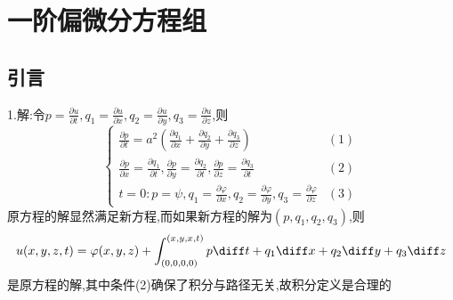 \chapter{一阶偏微分方程组}
\section{引言}
1.解:令$p=\frac{\partial u}{\partial t},q_1=\frac{\partial u}{\partial x},q_2=\frac{\partial u}{\partial y},q_3=\frac{\partial u}{\partial z}$,则
\[\begin{cases}
\frac{\partial p}{\partial t}=a^2\left(\frac{\partial q_1}{\partial x}+\frac{\partial q_2}{\partial y}+\frac{\partial q_3}{\partial z}\right)&(1)\\
\frac{\partial p}{\partial x}=\frac{\partial q_1}{\partial t},\frac{\partial p}{\partial y}=\frac{\partial q_2}{\partial t},\frac{\partial p}{\partial z}=\frac{\partial q_3}{\partial t}&(2)\\
t=0:p=\psi,q_1=\frac{\partial\varphi}{\partial x},q_2=\frac{\partial\varphi}{\partial y},q_3=\frac{\partial\varphi}{\partial z}&(3)
\end{cases}\]
原方程的解显然满足新方程,而如果新方程的解为$(p,q_1,q_2,q_3)$,则
\[u(x,y,z,t)=\varphi(x,y,z)+\int_{(0,0,0,0)}^{(x,y,x,t)}p\diff t+q_1\diff x+q_2\diff y+q_3\diff z\]
是原方程的解,其中条件(2)确保了积分与路径无关,故积分定义是合理的
